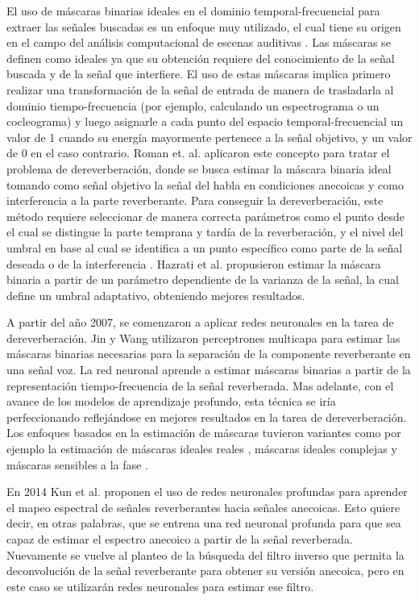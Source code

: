  
El uso de máscaras binarias ideales en el dominio temporal-frecuencial para extraer las señales buscadas \cite{binarymask} es un enfoque muy utilizado, el cual tiene su origen en el campo del análisis computacional de escenas auditivas \cite{ASA}. Las máscaras se definen como ideales ya que su obtención requiere del conocimiento de la señal buscada y de la señal que interfiere. El uso de estas máscaras implica primero realizar una transformación de la señal de entrada de manera de trasladarla al dominio tiempo-frecuencia (por ejemplo, calculando un espectrograma o un cocleograma) y luego asignarle a cada punto del espacio temporal-frecuencial un valor de 1 cuando su energía mayormente pertenece a la señal objetivo, y un valor de 0 en el caso contrario. Roman et. al. \cite{rev_mask} aplicaron este concepto para tratar el problema de dereverberación, donde se busca estimar la máscara binaria ideal tomando como señal objetivo la señal del habla en condiciones anecoicas y como interferencia a la parte reverberante. Para conseguir la dereverberación, este método requiere seleccionar de manera correcta parámetros como el punto desde el cual se distingue la parte temprana y tardía de la reverberación, y el nivel del umbral en base al cual se identifica a un punto específico como parte de la señal deseada o de la interferencia \cite{parametros}. Hazrati et al. \cite{hazrati} propusieron estimar la máscara binaria a partir de un parámetro dependiente de la varianza de la señal, la cual define un umbral adaptativo, obteniendo mejores resultados. 

A partir del año 2007, se comenzaron a aplicar redes neuronales en la tarea de dereverberación. Jin y Wang \cite{MLP} utilizaron perceptrones multicapa para estimar las máscaras binarias necesarias para la separación de la componente reverberante en una señal voz. La red neuronal aprende a estimar máscaras binarias a partir de la representación tiempo-frecuencia de la señal reverberada. Mas adelante, con el avance de los modelos de aprendizaje profundo, esta técnica se iría perfeccionando reflejándose en mejores resultados en la tarea de dereverberación. Los enfoques basados en la estimación de máscaras tuvieron variantes como por ejemplo la estimación de máscaras ideales reales \cite{cIRM}, máscaras ideales complejas \cite{IRM} y máscaras sensibles a la fase \cite{GAN}.
  
En 2014 Kun et al. \cite{ezeKun} proponen el uso de redes neuronales profundas para aprender el mapeo espectral de señales reverberantes hacia señales anecoicas. Esto quiere decir, en otras palabras, que se entrena una red neuronal profunda para que sea capaz de estimar el espectro anecoico a partir de la señal reverberada. Nuevamente se vuelve al planteo de la búsqueda del filtro inverso que permita la deconvolución de la señal reverberante para obtener su versión anecoica, pero en este caso se utilizarán redes neuronales para estimar ese filtro. 

